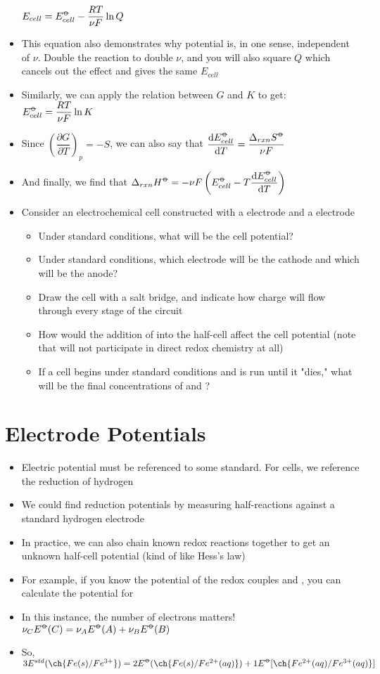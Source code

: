 \documentclass[12pt, openany, letterpaper]{memoir}
\begin{document}
\begin{itemize}
	$E_{cell}=E_{cell}^{\std}-\dfrac{RT}{\nu F}\ln Q$
	\item This equation also demonstrates why potential is, in one sense, independent of $\nu$. Double the reaction to double $\nu$, and you will also square $Q$ which cancels out the effect and gives the same $E_{cell}$
	\item Similarly, we can apply the relation between $G$ and $K$ to get: $E_{cell}^{\std}=\dfrac{RT}{\nu F}\ln K$
	\item Since $\left(\dfrac{\partial G}{\partial T}\right)_p=-S$, we can also say that $\dfrac{\mathrm{d}E_{cell}^{\std}}{\mathrm{d}T} = \dfrac{\Delta_{rxn}S^{\std}}{\nu F}$
	\item And finally, we find that $\Delta_{rxn} H^{\std} = -\nu F\left(E_{cell}^{\std}-T\dfrac{\mathrm{d}E_{cell}^{\std}}{\mathrm{d}T}\right)$
	\item Consider an electrochemical cell constructed with a  electrode and a   electrode
	\begin{itemize}
		\item Under standard conditions, what will be the cell potential?
		\item Under standard conditions, which electrode will be the cathode and which will be the anode?
		\item Draw the cell with a salt bridge, and indicate how charge will flow through every stage of the circuit
		\item How would the addition of  into the  half-cell affect the cell potential (note that  will not participate in direct redox chemistry at all)
		\item If a cell begins under standard conditions and is run until it "dies," what will be the final concentrations of  and ?
	\end{itemize}
\end{itemize}
\section{Electrode Potentials}
\begin{itemize}
	\item Electric potential must be referenced to some standard. For cells, we reference the reduction of hydrogen
	\item We could find reduction potentials by measuring half-reactions against a standard hydrogen electrode
	\item In practice, we can also chain known redox reactions together to get an unknown half-cell potential (kind of like Hess's law)
	\item For example, if you know the potential of the redox couples  and , you can calculate the potential for 
	\item In this instance, the number of electrons matters! $\nu_CE^{\std}(C) = \nu_AE^{\std}(A) + \nu_BE^{\std}(B)$
	\item So, $3E^{std}(\ch{Fe(s)/Fe^{3+}}) = 2E^{\std}(\ch{Fe(s)/Fe^{2+}(aq)}) + 1E^{\std}[\ch{Fe^{2+}(aq)/Fe^{3+}(aq)}]$
\end{itemize}
\setcounter{chapter}{15}
\end{document}
